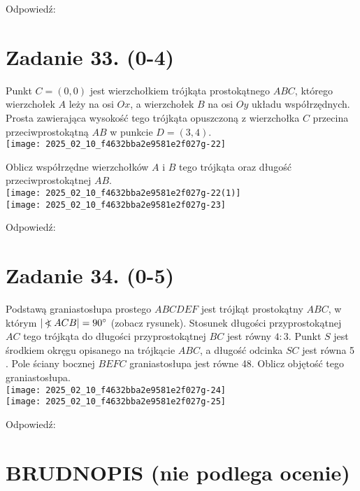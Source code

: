 \documentclass[10pt]{article}
\newcommand\Varangle{\mathop{{<\!\!\!\!\!\text{\small)}}\:}\nolimits}
\begin{document}
Odpowiedź:

\section*{Zadanie 33. (0-4)}
Punkt \(C=(0,0)\) jest wierzchołkiem trójkąta prostokątnego \(A B C\), którego wierzchołek \(A\) leży na osi \(O x\), a wierzchołek \(B\) na osi \(O y\) układu współrzędnych. Prosta zawierająca wysokość tego trójkąta opuszczoną z wierzchołka \(C\) przecina przeciwprostokątną \(A B\) w punkcie \(D=(3,4)\).\\
\texttt{[image: 2025\_02\_10\_f4632bba2e9581e2f027g-22]}

Oblicz współrzędne wierzchołków \(A\) i \(B\) tego trójkąta oraz długość przeciwprostokątnej \(A B\).\\
\texttt{[image: 2025\_02\_10\_f4632bba2e9581e2f027g-22(1)]}\\
\texttt{[image: 2025\_02\_10\_f4632bba2e9581e2f027g-23]}

Odpowiedź:

\section*{Zadanie 34. (0-5)}
Podstawą graniastosłupa prostego \(A B C D E F\) jest trójkąt prostokątny \(A B C\), w którym \(|\Varangle A C B|=90^{\circ}\) (zobacz rysunek). Stosunek długości przyprostokątnej \(A C\) tego trójkąta do długości przyprostokątnej \(B C\) jest równy \(4: 3\). Punkt \(S\) jest środkiem okręgu opisanego na trójkącie \(A B C\), a długość odcinka \(S C\) jest równa 5 . Pole ściany bocznej \(B E F C\) graniastosłupa jest równe 48. Oblicz objętość tego graniastosłupa.\\
\texttt{[image: 2025\_02\_10\_f4632bba2e9581e2f027g-24]}\\
\texttt{[image: 2025\_02\_10\_f4632bba2e9581e2f027g-25]}

Odpowiedź:

\section*{BRUDNOPIS (nie podlega ocenie)}
\end{document}
